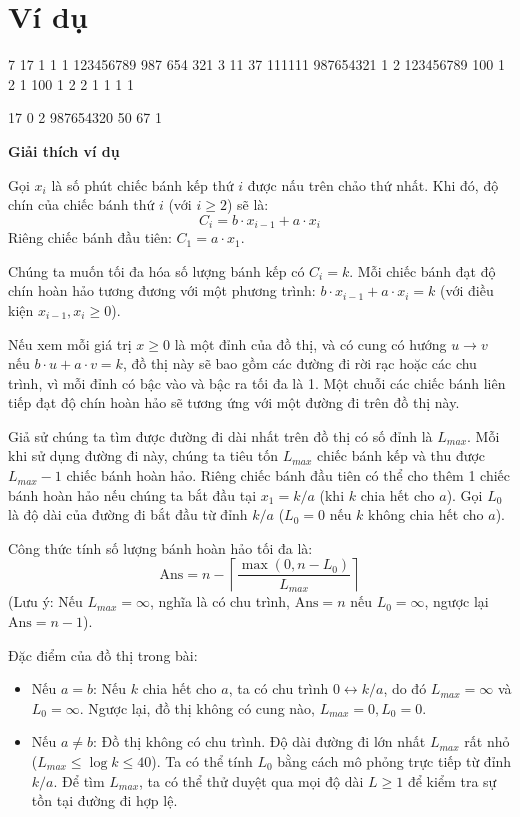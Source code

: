 \documentclass[12pt,a4paper]{article}
\newcommand{\explanation}{%
  \vspace{6pt}\textbf{\textcolor{sectioncolor}{Giải thích ví dụ}}\par\vspace{2pt}%
}
\begin{document}
\section*{Ví dụ}

\begin{inputbox}
7
17 1 1 1
123456789 987 654 321
3 11 37 111111
987654321 1 2 123456789
100 1 2 1
100 1 2 2
1 1 1 1
\end{inputbox}
\begin{outputbox}
17
0
2
987654320
50
67
1
\end{outputbox}


\explanation
Gọi $x_i$ là số phút chiếc bánh kếp thứ $i$ được nấu trên chảo thứ nhất.
Khi đó, độ chín của chiếc bánh thứ $i$ (với $i \ge 2$) sẽ là:
\[ C_i = b \cdot x_{i-1} + a \cdot x_i \]
Riêng chiếc bánh đầu tiên: $C_1 = a \cdot x_1$.

Chúng ta muốn tối đa hóa số lượng bánh kếp có $C_i = k$.
Mỗi chiếc bánh đạt độ chín hoàn hảo tương đương với một phương trình:
$b \cdot x_{i-1} + a \cdot x_i = k$ (với điều kiện $x_{i-1}, x_i \ge 0$).

Nếu xem mỗi giá trị $x \ge 0$ là một đỉnh của đồ thị, và có cung có hướng $u \to v$ nếu $b \cdot u + a \cdot v = k$, đồ thị này sẽ bao gồm các đường đi rời rạc hoặc các chu trình, vì mỗi đỉnh có bậc vào và bậc ra tối đa là 1. Một chuỗi các chiếc bánh liên tiếp đạt độ chín hoàn hảo sẽ tương ứng với một đường đi trên đồ thị này. 

Giả sử chúng ta tìm được đường đi dài nhất trên đồ thị có số đỉnh là $L_{max}$. Mỗi khi sử dụng đường đi này, chúng ta tiêu tốn $L_{max}$ chiếc bánh kếp và thu được $L_{max} - 1$ chiếc bánh hoàn hảo. Riêng chiếc bánh đầu tiên có thể cho thêm 1 chiếc bánh hoàn hảo nếu chúng ta bắt đầu tại $x_1 = k/a$ (khi $k$ chia hết cho $a$). Gọi $L_0$ là độ dài của đường đi bắt đầu từ đỉnh $k/a$ ($L_0 = 0$ nếu $k$ không chia hết cho $a$).

Công thức tính số lượng bánh hoàn hảo tối đa là:
\[ \text{Ans} = n - \left\lceil \frac{\max(0, n - L_0)}{L_{max}} \right\rceil \]
(Lưu ý: Nếu $L_{max} = \infty$, nghĩa là có chu trình, $\text{Ans} = n$ nếu $L_0 = \infty$, ngược lại $\text{Ans} = n - 1$).

Đặc điểm của đồ thị trong bài:
\begin{itemize}
    \item Nếu $a = b$: Nếu $k$ chia hết cho $a$, ta có chu trình $0 \leftrightarrow k/a$, do đó $L_{max} = \infty$ và $L_0 = \infty$. Ngược lại, đồ thị không có cung nào, $L_{max} = 0, L_0 = 0$.
    \item Nếu $a \neq b$: Đồ thị không có chu trình. Độ dài đường đi lớn nhất $L_{max}$ rất nhỏ ($L_{max} \le \log k \le 40$). Ta có thể tính $L_0$ bằng cách mô phỏng trực tiếp từ đỉnh $k/a$. Để tìm $L_{max}$, ta có thể thử duyệt qua mọi độ dài $L \ge 1$ để kiểm tra sự tồn tại đường đi hợp lệ.
\end{itemize}
\end{document}
